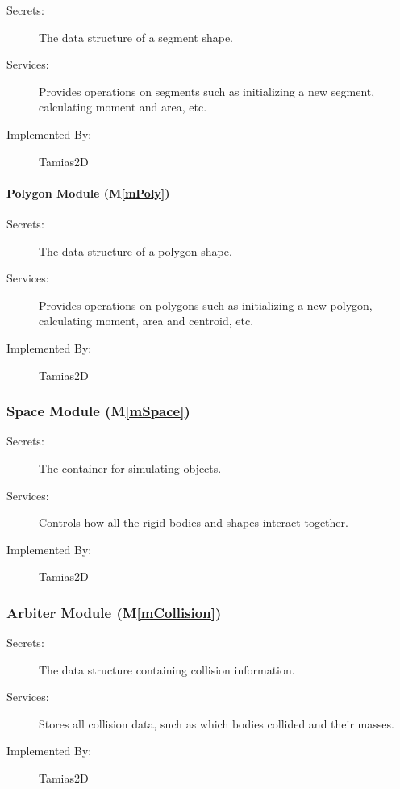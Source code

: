 \documentclass[12pt]{article}
\newcommand{\mref}[1]{M\ref{#1}}
\newcommand{\progname}{Tamias2D}
\begin{document}
\begin{description}
	\item[Secrets:] The data structure of a segment shape.
	\item[Services:] Provides operations on segments such as initializing a new segment, calculating moment and area, etc.
	\item[Implemented By:] {\progname}
\end{description}

\paragraph{Polygon Module (\mref{mPoly})}

\begin{description}
	\item[Secrets:] The data structure of a polygon shape.
	\item[Services:] Provides operations on polygons such as initializing a new polygon, calculating moment, area and centroid, etc.
	\item[Implemented By:] {\progname}
\end{description}

\subsubsection{Space Module (\mref{mSpace})}

\begin{description}
	\item[Secrets:] The container for simulating objects.
	\item[Services:]Controls how all the rigid bodies and shapes interact together.
	\item[Implemented By:] {\progname}
\end{description} 

\subsubsection{Arbiter Module (\mref{mCollision})}

\begin{description}
\item[Secrets:]The data structure containing collision information.
\item[Services:]Stores all collision data, such as which bodies 
collided and their masses.
\item[Implemented By:] {\progname}
\end{description}
 
\end{document}
